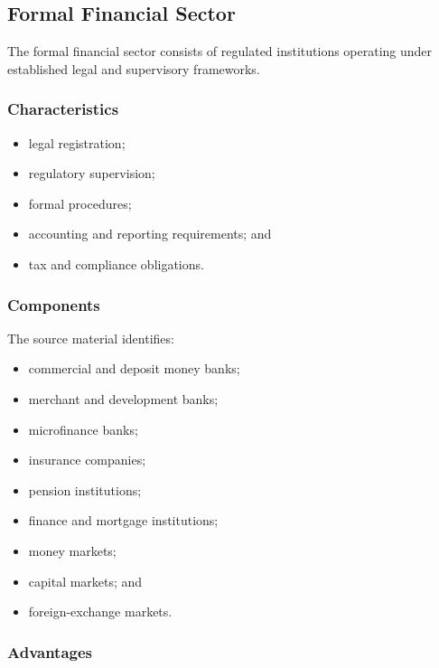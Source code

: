 \documentclass[
]{article}
\providecommand{\tightlist}{%
  \setlength{\itemsep}{0pt}\setlength{\parskip}{0pt}}
\begin{document}
\subsection{Formal Financial Sector}\label{formal-financial-sector}

The formal financial sector consists of regulated institutions operating under established legal and supervisory frameworks.

\subsubsection{Characteristics}\label{characteristics}

\begin{itemize}
\tightlist
\item
  legal registration;
\item
  regulatory supervision;
\item
  formal procedures;
\item
  accounting and reporting requirements; and
\item
  tax and compliance obligations.
\end{itemize}

\subsubsection{Components}\label{components}

The source material identifies:

\begin{itemize}
\tightlist
\item
  commercial and deposit money banks;
\item
  merchant and development banks;
\item
  microfinance banks;
\item
  insurance companies;
\item
  pension institutions;
\item
  finance and mortgage institutions;
\item
  money markets;
\item
  capital markets; and
\item
  foreign-exchange markets.
\end{itemize}

\subsubsection{Advantages}\label{advantages}
\end{document}
